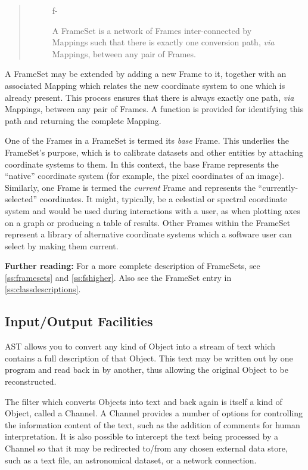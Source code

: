 \documentclass[twoside,11pt]{article}
\newcommand{\appref}[1]{Appendix~\ref{#1}}
\newcommand{\secref}[1]{\S\ref{#1}}
\renewcommand{\appref}[1]{\ref{#1}}
\renewcommand{\secref}[1]{\ref{#1}}
\begin{document}
{\begin{htmlonly}
\begin{quote}
\begin{figure}
f-
   \caption{A FrameSet is a network of Frames inter-connected by Mappings
   such that there is exactly one conversion path, {\em{via}} Mappings,
   between any pair of Frames.}
   \end{figure}
   \end{quote}
\end{htmlonly}
A FrameSet may be extended by adding a new Frame to it, together with
an associated Mapping which relates the new coordinate system to one
which is already present.  This process ensures that there is always
exactly one path, {\em{via}} Mappings, between any pair of Frames.  A
function is provided for identifying this path and returning the
complete Mapping.

One of the Frames in a FrameSet is termed its {\em{base}} Frame.  This
underlies the FrameSet's purpose, which is to calibrate datasets and
other entities by attaching coordinate systems to them.  In this
context, the base Frame represents the ``native'' coordinate system
(for example, the pixel coordinates of an image).  Similarly, one
Frame is termed the {\em{current}} Frame and represents the
``currently-selected'' coordinates.  It might, typically, be a
celestial or spectral coordinate system and would be used during 
interactions with
a user, as when plotting axes on a graph or producing a table of
results.  Other Frames within the FrameSet represent a library of
alternative coordinate systems which a software user can select by
making them current.

{\bf{Further reading:}} For a more complete description of
FrameSets, see \secref{ss:framesets} and \secref{ss:fshigher}. Also
see the FrameSet entry in \appref{ss:classdescriptions}.

\subsection{Input/Output Facilities}

AST allows you to convert any kind of Object into a stream of text
which contains a full description of that Object. This text may be
written out by one program and read back in by another, thus allowing
the original Object to be reconstructed.

The filter which converts Objects into text and back again is itself a
kind of Object, called a Channel. A Channel provides a number of
options for controlling the information content of the text, such as
the addition of comments for human interpretation.  It is also
possible to intercept the text being processed by a Channel so that it
may be redirected to/from any chosen external data store, such as a
text file, an astronomical dataset, or a network connection.

}
\end{document}
